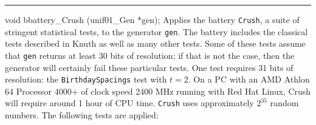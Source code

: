 \hrule
\code


void bbattery_Crush (unif01_Gen *gen);
\endcode
  \tab
  Applies the battery {\tt Crush}, a suite of stringent statistical
  tests, to the generator {\tt gen}.
  The battery includes the classical tests described in Knuth \cite{rKNU98a}
  as well as many other tests. Some of these tests assume that
  {\tt gen} returns at least 30 bits of resolution; if that
  is not the case, then the generator will certainly
  fail these particular tests. One test requires 31 bits of resolution:
  the {\tt BirthdaySpacings} test with $t=2$.
  On a PC with an AMD Athlon 64 Processor 4000+
  of clock speed 2400 MHz running with Red Hat Linux, Crush
  will require around 1 hour of CPU time. {\tt Crush} uses approximately
  $2^{35}$ random numbers.
  The following tests are applied: \label{bat:Crush}
  \endtab

